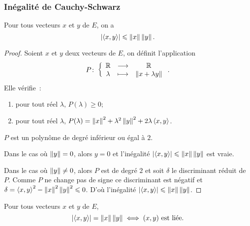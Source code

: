 \subsubsection{Inégalité de Cauchy-Schwarz}

\begin{theo}
  Pour tous vecteurs $x$ et $y$ de $E$, on a
  \begin{equation}
    \left\lvert\left\langle{x},{y}\right\rangle\right\rvert \leqslant \left\lVert x\right\rVert\left\lVert y\right\rVert.
  \end{equation}
\end{theo}
\begin{proof}
  Soient $x$ et $y$ deux vecteurs de $E$, on définit l'application
  \begin{equation}
    P\colon \left\{\begin{array}{ccc} \mathbb{R} & \longrightarrow &\mathbb{R}\\ \lambda & \longmapsto & \left\lVert x+\lambda y\right\rVert \end{array} \right..
  \end{equation}
  Elle vérifie~:
  \begin{enumerate}
  \item pour tout réel $\lambda$, $P(\lambda)\geqslant 0$;
  \item pour tout réel $\lambda$, $P(\lambda) = \left\lVert x\right\rVert^2+\lambda^2\left\lVert y\right\rVert^2+2\lambda\left\langle{x},{y}\right\rangle$.
  \end{enumerate}
  $P$ est un polynôme de degré inférieur ou égal à $2$. 

  Dans le cas où $\left\lVert y\right\rVert=0$, alors $y=0$ et l'inégalité $\left\lvert\left\langle{x},{y}\right\rangle\right\rvert \leqslant \left\lVert x\right\rVert\left\lVert y\right\rVert$ est vraie.

  Dans le cas où $\left\lVert y\right\rVert\neq 0$, alors $P$ est de degré $2$ et soit $\delta$ le discriminant réduit de $P$. Comme $P$ ne change pas de signe ce discriminant est négatif et $\delta=\left\langle{x},{y}\right\rangle^2-\left\lVert x\right\rVert^2\left\lVert y\right\rVert^2\leqslant 0$. D'où l'inégalité $\left\lvert\left\langle{x},{y}\right\rangle\right\rvert \leqslant \left\lVert x\right\rVert\left\lVert y\right\rVert$.
\end{proof}
%
\begin{prop}
  Pour tous vecteurs $x$ et $y$ de $E$,
  \begin{equation}
    \left\lvert\left\langle{x},{y}\right\rangle\right\rvert=\left\lVert x\right\rVert\left\lVert y\right\rVert \iff (x,y) \text{~est liée}.
  \end{equation}
\end{prop}
